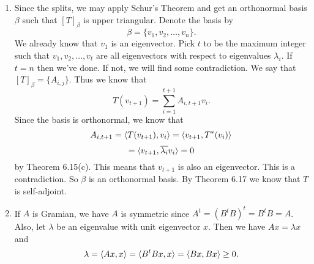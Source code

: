 \begin{enumerate}
\item Since the \charpoly{} splits, we may apply Schur's Theorem and get an orthonormal basis $\beta $ such that $[T]_{\beta}$ is upper triangular. Denote the basis by 
\[\beta =\{v_1,v_2,\ldots ,v_n\}.\]
We already know that $v_1$ is an eigenvector. Pick $t$ to be the maximum integer such that $v_1,v_2,\ldots ,v_t$ are all eigenvectors with respect to eigenvalues $\lambda _i$. If $t=n$ then we've done. If not, we will find some contradiction. We say that $[T]_{\beta}=\{A_{i,j}\}$. Thus we know that 
\[T(v_{t+1})=\sum_{i=1}^{t+1}{A_{i,t+1}v_i}.\]
Since the basis is orthonormal, we know that 
\[A_{i,t+1}=\langle T(v_{t+1}),v_i\rangle =\langle v_{t+1},T^*(v_i)\rangle \]
\[=\langle v_{t+1},\overline{\lambda_i}v_i\rangle =0\]
by Theorem 6.15(c). This means that $v_{t+1}$ is also an eigenvector. This is a contradiction. So $\beta $ is an orthonormal basis. By Theorem 6.17 we know that $T$ is self-adjoint.
\item If $A$ is Gramian, we have $A$ is symmetric since $A^t=(B^tB)^t=B^tB=A$. Also, let $\lambda $ be an eigenvalue with unit eigenvector $x$. Then we have $Ax=\lambda x$ and 
\[\lambda =\langle Ax,x\rangle =\langle B^tBx,x\rangle =\langle Bx,Bx\rangle \geq 0.\]


\end{enumerate}
